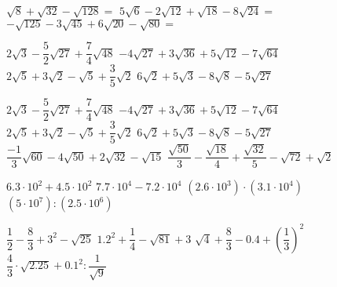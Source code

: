 \documentclass[12pt]{article}
\begin{document}
$\sqrt{8} + \sqrt{32} - \sqrt{128} =$
$5\sqrt{6} - 2\sqrt{12} + \sqrt{18} - 8\sqrt{24} =$
$-\sqrt{125} - 3\sqrt{45} + 6\sqrt{20} - \sqrt{80} =$

$2\sqrt{3} - \dfrac{5}{2}\sqrt{27} + \dfrac{7}{4}\sqrt{48}$
$-4\sqrt{27} + 3\sqrt{36} + 5\sqrt{12} - 7\sqrt{64}$
$2\sqrt{5} + 3\sqrt{2} - \sqrt{5} + \dfrac{3}{5}\sqrt{2}$
$6\sqrt{2} + 5\sqrt{3} - 8\sqrt{8} - 5\sqrt{27}$

$2\sqrt{3} - \dfrac{5}{2}\sqrt{27} + \dfrac{7}{4}\sqrt{48}$
$-4\sqrt{27} + 3\sqrt{36} + 5\sqrt{12} - 7\sqrt{64}$
$2\sqrt{5} + 3\sqrt{2} - \sqrt{5} + \dfrac{3}{5}\sqrt{2}$
$6\sqrt{2} + 5\sqrt{3} - 8\sqrt{8} - 5\sqrt{27}$
$\dfrac{-1}{3}\sqrt{60} - 4\sqrt{50} + 2\sqrt{32} - \sqrt{15}$
$\dfrac{\sqrt{50}}{3} - \dfrac{\sqrt{18}}{4} + \dfrac{\sqrt{32}}{5} - \sqrt{72} + \sqrt{2}$

$6.3\cdot10^2 + 4.5\cdot10^2$
$7.7\cdot10^4 - 7.2\cdot10^4$
$(2.6\cdot10^3)\cdot(3.1\cdot10^4)$
$(5\cdot10^7):(2.5\cdot10^6)$

$\dfrac{1}{2} - \dfrac{8}{3} +3^2 - \sqrt{25}$
$1.2^2 + \dfrac{1}{4} - \sqrt{81} + 3$
$\sqrt{4} + \dfrac{8}{3} - 0.4 + (\dfrac{1}{3})^2$
$\dfrac{4}{3}\cdot\sqrt{2.25} + 0.1^2:\dfrac{1}{\sqrt{9}}$
\end{document}
